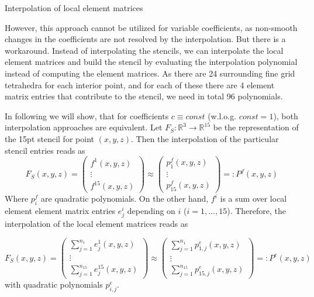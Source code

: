 \documentclass[a4paper,11pt,reqno]{amsart}
\numberwithin{figure}{section}
\numberwithin{table}{section}
\numberwithin{figure}{section}
\def\RR{\mathbb{R}}
\begin{document}
\newpage
\begin{section}{Interpolation of local element matrices}
\label{sec:interpolationLocElementMat}

However, this approach cannot be utilized for variable coefficients, as non-smooth
changes in the coefficients are not resolved by the interpolation. But there is a 
workaround. Instead of interpolating the stencils, we can interpolate the local 
element matrices and build the stencil by evaluating the interpolation polynomial
instead of computing the element matrices. As there are 24 surrounding fine grid
tetrahedra for each interior point, and for each of these there are 4 element matrix
entries that contribute to the stencil, we need in total 96 polynomials.

In following we will show, that for coefficients $c\equiv const$ (w.l.o.g. $const = 1$),
both interpolation approaches are equivalent.
Let $F_S : \RR^3 \rightarrow \RR^{15}$ be the representation of the 15pt stencil
for point $(x,y,z)$. Then the interpolation of the particular stencil entries reads
as
\begin{equation}
\label{eq:interpolationStencil}
F_S(x,y,z) = 
\begin{pmatrix}
f^1(x,y,z) \\
\vdots \\
f^{15}(x,y,z)
\end{pmatrix}
\approx
\begin{pmatrix}
p^f_1(x,y,z) \\
\vdots \\
p^f_{15}(x,y,z)
\end{pmatrix}
=: P^f(x,y,z)
\end{equation}
Where $p^f_i$ are quadratic polynomials.
On the other hand, $f^i$ is a sum over local element element matrix entries 
$e_j^i$ depending on $i$ ($i = 1,...,15$). 
Therefore, the interpolation of the local element matrices reads as

\begin{equation}
\label{eq:interpolationLocStiffness}
F_S(x,y,z) = 
\begin{pmatrix}
\sum_{j=1}^{n_1}e_j^1(x,y,z) \\
\vdots \\
\sum_{j=1}^{n_{15}}e_j^{15}(x,y,z) 
\end{pmatrix}
\approx
\begin{pmatrix}
\sum_{j=1}^{n_1}p_{1,j}^e(x,y,z)  \\
\vdots \\
\sum_{j=1}^{n_{15}}p_{15,j}^e(x,y,z) 
\end{pmatrix}
=: P^e(x,y,z)
\end{equation}
with quadratic polynomials $p^e_{i,j}$.


\end{section}
\end{document}
